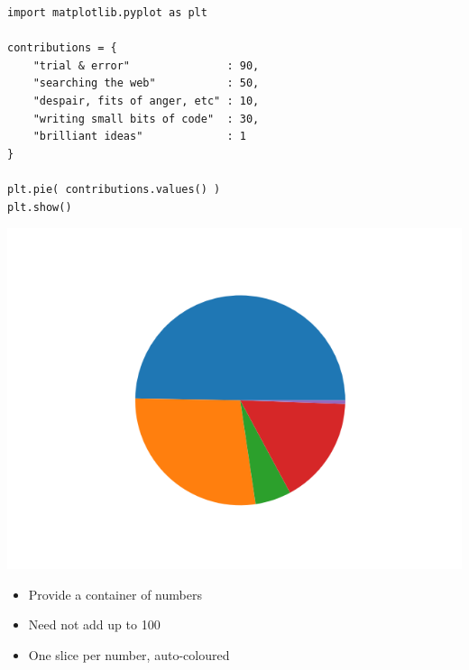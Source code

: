 \begin{frame}[fragile]
%
\begin{codebox}[Example: Simple Pie Plot, width=.58\linewidth, nobeforeafter, equal height group = grpXmpPie1]
\begin{verbatim}
import matplotlib.pyplot as plt

contributions = {
    "trial & error"               : 90,
    "searching the web"           : 50,
    "despair, fits of anger, etc" : 10,
    "writing small bits of code"  : 30,
    "brilliant ideas"             : 1
}

plt.pie( contributions.values() )
plt.show()
\end{verbatim}
\end{codebox}
%
\begin{tcolorbox}[title=Output: Simple Pie Plot, width=.4\linewidth, nobeforeafter, equal height group = grpXmpPie1]
	\includegraphics[width=\linewidth]{./gfx/plt-pie-simple}
\end{tcolorbox}
%
\begin{itemize}
\item Provide a container of numbers
\item Need not add up to 100
\item One slice per number, auto-coloured
\end{itemize}
%
\end{frame}


